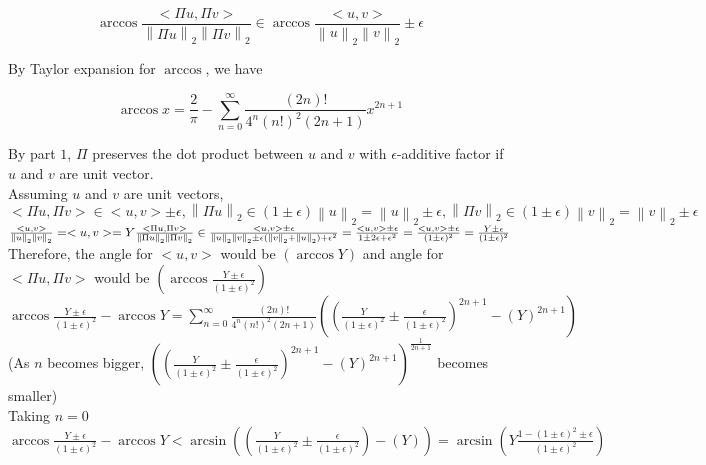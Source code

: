 \documentclass[11pt]{article}%
\newcommand{\norm}[1]{\left\lVert#1\right\rVert}
\begin{document}
\begin{questions}[1]
\begin{enumerate}
\begin{enumerate}
                $$\arccos\frac{<\Pi u, \Pi v>}{\norm{\Pi u}_2\norm{\Pi v}_2} \in \arccos\frac{<u, v>}{\norm{u}_2\norm{v}_2} \pm\epsilon$$
            
                By Taylor expansion for $\arccos$, we have 
                
                $$ \arccos {x} = \frac{2}{\pi} -  \sum_{n=0}^{\infty}\frac{(2n)!}{4^n(n!)^2(2n+1)}x^{2n+1} $$
                
                By part $1$, $\Pi$ preserves the dot product between $u$ and $v$ with $\epsilon$-additive factor if $u$ and $v$ are unit vector.\\
    
                Assuming $u$ and $v$ are unit vectors, $<\Pi u, \Pi v> \in <u,v> \pm\epsilon, \norm{\Pi u}_2 \in (1\pm\epsilon)\norm{u}_2 = \norm{u}_2 \pm \epsilon, \norm{\Pi v}_2 \in (1\pm\epsilon)\norm{v}_2 = \norm{v}_2 \pm \epsilon$\\
    
                $\frac{<u, v>}{\norm{u}_2\norm{v}_2} = <u,v> = Y \\
                \frac{<\Pi u, \Pi v>}{\norm{\Pi u}_2\norm{\Pi v}_2} \in \frac{<u, v>\pm\epsilon}{\norm{u}_2\norm{v}_2 \pm \epsilon(\norm{v}_2+\norm{u}_2)+\epsilon^2} = \frac{<u, v>\pm\epsilon}{1 \pm 2\epsilon + \epsilon^2} = \frac{<u,v> \pm \epsilon}{(1\pm\epsilon)^2} = \frac{Y\pm\epsilon}{(1\pm\epsilon)^2}$\\
                
                Therefore, the angle for $<u,v>$ would be $(\arccos{Y})$ and angle for $<\Pi u, \Pi v>$ would be $(\arccos{\frac{Y\pm\epsilon}{(1\pm\epsilon)^2}})$\\
                
                $\arccos{\frac{Y\pm\epsilon}{(1\pm\epsilon)^2}} - \arccos{Y} = \sum_{n=0}^{\infty}\frac{(2n)!}{4^n(n!)^2(2n+1)}((\frac{Y}{(1\pm\epsilon)^2}\pm \frac{\epsilon}{(1\pm\epsilon)^2})^{2n+1} - (Y)^{2n+1})$ \\
                
                (As $n$ becomes bigger, $((\frac{Y}{(1\pm\epsilon)^2}\pm \frac{\epsilon}{(1\pm\epsilon)^2})^{2n+1} - (Y)^{2n+1})^\frac{1}{2n+1}$ becomes smaller)\\
    
                Taking $n = 0$\\
                $ \arccos{\frac{Y\pm\epsilon}{(1\pm\epsilon)^2}} - \arccos{Y} < \arcsin {((\frac{Y}{(1\pm\epsilon)^2}\pm \frac{\epsilon}{(1\pm\epsilon)^2}) - (Y))} = \arcsin(Y\frac{1 - (1\pm\epsilon)^2 \pm \epsilon}{(1\pm\epsilon)^2})$ \\
                

\end{enumerate}
\end{enumerate}
\end{questions}
\end{document}
